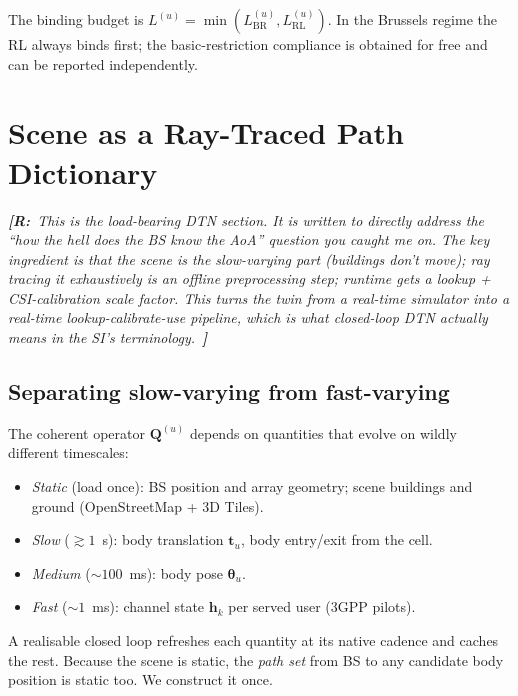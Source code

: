 \documentclass[journal,twocolumn,10pt]{IEEEtran}
\theoremstyle{definition}
\newcommand{\robinnote}[1]{%
  {\color{red!75!black}\textit{\textbf{[R:}~#1~\textbf{]}}}}
\newcommand{\hh}{\mathbf{h}}
\newcommand{\Q}{\mathbf{Q}}
\begin{document}
The binding budget is
$L^{(u)}=\min(L^{(u)}_{\mathrm{BR}},L^{(u)}_{\mathrm{RL}})$.
In the Brussels regime the RL always binds first; the
basic-restriction compliance is obtained for free and can be
reported independently.

\section{Scene as a Ray-Traced Path Dictionary}\label{sec:scene-dict}

\robinnote{This is the load-bearing DTN section. It is written to
directly address the ``how the hell does the BS know the
AoA'' question you caught me on. The key ingredient is
that the scene is the slow-varying part (buildings don't move);
ray tracing it exhaustively is an offline preprocessing step;
runtime gets a \emph{lookup} + CSI-calibration scale factor.
This turns the twin from a real-time simulator into a real-time
\emph{lookup-calibrate-use} pipeline, which is what closed-loop
DTN actually means in the SI's terminology.}

\subsection{Separating slow-varying from fast-varying}

The coherent operator $\Q^{(u)}$ depends on quantities that
evolve on wildly different timescales:

\begin{itemize}
\item \emph{Static} (load once): BS position and array geometry;
  scene buildings and ground (OpenStreetMap + 3D Tiles).
\item \emph{Slow} ($\gtrsim 1$~s): body translation $\mathbf{t}_u$,
  body entry/exit from the cell.
\item \emph{Medium} ($\sim 100$~ms): body pose $\bm\theta_u$.
\item \emph{Fast} ($\sim 1$~ms): channel state $\hh_k$ per served
  user (3GPP pilots).
\end{itemize}

A realisable closed loop refreshes each quantity at its native
cadence and caches the rest. Because the scene is static, the
\emph{path set} from BS to any candidate body position is static
too. We construct it once.
\end{document}
